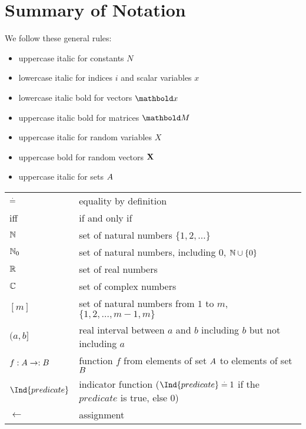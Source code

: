 
\chapter{Summary of Notation}

\begin{fullwidth}
We follow these general rules: \begin{itemize}[noitemsep]
    \item uppercase italic for constants $N$
    \item lowercase italic for indices $i$ and scalar variables $x$
    \item lowercase italic bold for vectors $\vx$
    \item uppercase italic bold for matrices $\mM$
    \item uppercase italic for random variables $X$
    \item uppercase bold for random vectors $\mathbf{X}$
    \item uppercase italic for sets $A$
\end{itemize}

\begin{longtable}{p{2.5cm}l}
   $\overset{.}{=}$ & equality by definition \\
   iff & if and only if \\
   $\mathbb{N}$ & set of natural numbers $\{1, 2, \dots\}$ \\
   $\mathbb{N}_0$ & set of natural numbers, including $0$, $\mathbb{N} \cup \{0\}$ \\
   $\mathbb{R}$ & set of real numbers \\
   $\mathbb{C}$ & set of complex numbers \\
   $[m]$ & set of natural numbers from $1$ to $m$, $\{1, 2, \dots, m-1, m\}$ \\
   $(a,b]$ & real interval between $a$ and $b$ including $b$ but not including $a$ \\
   $f : A \to : B$ & function $f$ from elements of set $A$ to elements of set $B$ \\
   $\Ind{predicate}$ & indicator function ($\Ind{predicate} \defeq 1$ if the $predicate$ is true, else $0$) \\
   $\gets$ & assignment \\
\end{longtable}


\end{fullwidth}
